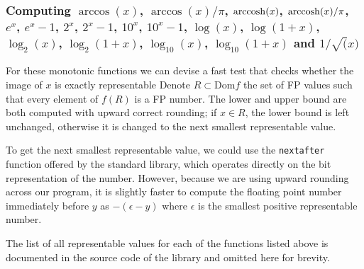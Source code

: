 \subsubsection{Computing $\arccos(x)$, $\arccos(x)/\pi$, $\operatorname{arccosh}(x)$, $\operatorname{arccosh}(x)/\pi$, $e^x$, $e^x-1$, $2^x$, $2^x-1$, $10^x$, $10^x-1$, $\log(x)$, $\log(1+x)$, $\log_2(x)$, $\log_2(1+x)$, $\log_{10}(x)$, $\log_{10}(1+x)$ and $1/\sqrt(x)$}
\label{sub:exactR}
For these monotonic functions we can devise a fast test that checks whether the image of $x$ is exactly representable
Denote $R\subset\mathrm{Dom}f$ the set of FP values such that every element of $f(R)$ is a FP number.
The lower and upper bound are both computed with upward correct rounding; if $x\in R$, the lower bound is left unchanged, otherwise it is changed to the next smallest representable value.

To get the next smallest representable value, we could use the \texttt{nextafter} function offered by the standard library, which operates directly on the bit representation of the number. However, because we are using upward rounding across our program, it is slightly faster to compute the floating point number immediately before $y$ as $-(\epsilon-y)$ where $\epsilon$ is the smallest positive representable number.

The list of all representable values for each of the functions listed above is documented in the source code of the library and omitted here for brevity.

